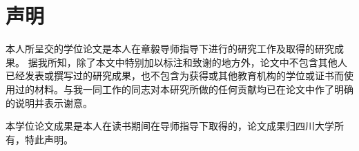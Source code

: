 
\chapter{声明}
本人所呈交的学位论文是本人在章毅导师指导下进行的研究工作及取得的研究成果。
据我所知，除了本文中特别加以标注和致谢的地方外，论文中不包含其他人已经发表或撰写过的研究成果，也不包含为获得{\universityname}或其他教育机构的学位或证书而使用过的材料。与我一同工作的同志对本研究所做的任何贡献均已在论文中作了明确的说明并表示谢意。

本学位论文成果是本人在{\universityname}读书期间在导师指导下取得的，论文成果归四川大学所有，特此声明。
\vspace{4cm}
\autograph
